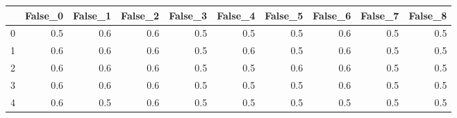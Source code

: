 \begin{tabular}{lrrrrrrrrr}
\toprule
{} &  False\_0 &  False\_1 &  False\_2 &  False\_3 &  False\_4 &  False\_5 &  False\_6 &  False\_7 &  False\_8 \\ \hline
\midrule
0 &      0.5 &      0.6 &      0.6 &      0.5 &      0.5 &      0.5 &      0.6 &      0.5 &      0.5 \\ \hline
1 &      0.6 &      0.6 &      0.6 &      0.5 &      0.6 &      0.5 &      0.6 &      0.5 &      0.5 \\ \hline
2 &      0.6 &      0.6 &      0.6 &      0.5 &      0.5 &      0.6 &      0.6 &      0.5 &      0.5 \\ \hline
3 &      0.6 &      0.6 &      0.6 &      0.5 &      0.5 &      0.5 &      0.6 &      0.5 &      0.5 \\ \hline
4 &      0.6 &      0.5 &      0.6 &      0.5 &      0.5 &      0.5 &      0.5 &      0.5 &      0.5 \\ \hline
\bottomrule
\end{tabular}
